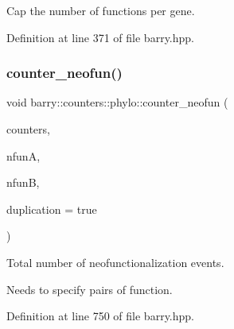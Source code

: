 Cap the number of functions per gene. 



Definition at line 371 of file barry.\+hpp.

\mbox{\label{namespacebarry_1_1counters_1_1phylo_a4cf48d44538ec0646783e29e89027838}} 
\subsubsection{\texorpdfstring{counter\+\_\+neofun()}{counter\_neofun()}}
{\footnotesize\ttfamily void barry\+::counters\+::phylo\+::counter\+\_\+neofun (\begin{DoxyParamCaption}\item[{\hyperlink{namespacebarry_1_1counters_1_1phylo_a4e401ffe66d04091343dcffaf915f8c3}{Phylo\+Counters} $\ast$}]{counters,  }\item[{\hyperlink{namespacebarry_a11dfc53ddb4672278319aa04f1e09a6c}{uint}}]{nfunA,  }\item[{\hyperlink{namespacebarry_a11dfc53ddb4672278319aa04f1e09a6c}{uint}}]{nfunB,  }\item[{bool}]{duplication = {\ttfamily true} }\end{DoxyParamCaption})\hspace{0.3cm}{\ttfamily [inline]}}



Total number of neofunctionalization events. 

Needs to specify pairs of function. 

Definition at line 750 of file barry.\+hpp.

\mbox{\label{namespacebarry_1_1counters_1_1phylo_a3394895262bbf1fd603193ef21b9ddb8}} 
